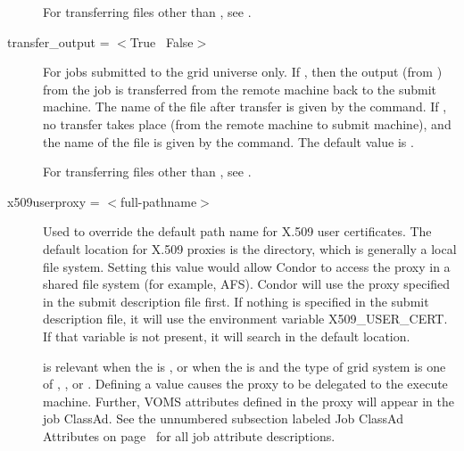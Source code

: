 \begin{description}
For transferring files other than ,
see .

\item[transfer\_output = $<$True \Bar\ False$>$]
For jobs submitted to the grid universe only.
If , then the output (from ) from the job
is transferred from the remote machine back to the submit machine.
The name of the file after transfer is given
by the  command.
If , no transfer takes place (from the remote machine
to submit machine),
and the name of the file is given
by the  command.
The default value is .

For transferring files other than ,
see .


\item[x509userproxy = $<$full-pathname$>$] Used to override the default
path name for X.509 user certificates. The default location for X.509 proxies
is the  directory,
which is generally a local file system.
Setting
this value would allow Condor to access the proxy in a shared file system
(for example, AFS).
Condor will use the proxy specified in the submit description file first.
If nothing is specified in the submit description file,
it will use the environment variable X509\_USER\_CERT.
If that variable is not present,
it will search in the default location.

 is relevant when
the  is ,
or when the  is 
and the type of grid system is one of ,
, or .
Defining a value causes the proxy to be delegated to the execute machine.
Further, VOMS attributes defined in the proxy will appear in
the job ClassAd.
See the unnumbered subsection labeled Job ClassAd Attributes
on page~\pageref{sec:Job-ClassAd-Attributes} for all job attribute descriptions.

\end{description} 


